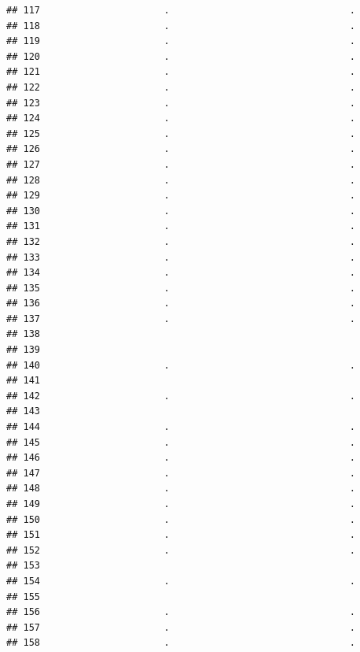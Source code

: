 \documentclass[
]{article}
\begin{document}
\begin{verbatim}
## 117                      .                                .
## 118                      .                                .
## 119                      .                                .
## 120                      .                                .
## 121                      .                                .
## 122                      .                                .
## 123                      .                                .
## 124                      .                                .
## 125                      .                                .
## 126                      .                                .
## 127                      .                                .
## 128                      .                                .
## 129                      .                                .
## 130                      .                                .
## 131                      .                                .
## 132                      .                                .
## 133                      .                                .
## 134                      .                                .
## 135                      .                                .
## 136                      .                                .
## 137                      .                                .
## 138                                                        
## 139                                                        
## 140                      .                                .
## 141                                                        
## 142                      .                                .
## 143                                                        
## 144                      .                                .
## 145                      .                                .
## 146                      .                                .
## 147                      .                                .
## 148                      .                                .
## 149                      .                                .
## 150                      .                                .
## 151                      .                                .
## 152                      .                                .
## 153                                                        
## 154                      .                                .
## 155                                                        
## 156                      .                                .
## 157                      .                                .
## 158                      .                                .

\end{verbatim}
\end{document}
